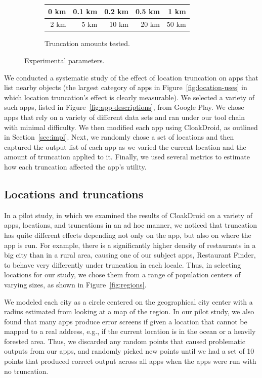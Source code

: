 \documentclass[10pt, conference, compsocconf]{IEEEtran}
\newcommand{\fuzzer}{CloakDroid\xspace}
\begin{document}
{\begin{figure}
    \bigskip{}

    \begin{subfigure}{\columnwidth}
      \centering
      \begin{tabular}{|r|r|r|r|r|} \hline
        0 km & 0.1 km & 0.2 km & 0.5 km & 1 km \\ \hline
         2 km & 5 km & 10 km & 20 km & 50 km \\ \hline
      \end{tabular}
      \caption{Truncation amounts tested.}
      \label{fig:truncations}
    \end{subfigure}

  \caption{Experimental parameters.}
\end{figure}
 
We conducted a systematic study of the effect of location truncation
on apps that list nearby objects (the largest category of apps in
Figure~\ref{fig:location-uses} in which location truncation's effect is clearly
measurable). We selected a variety of such apps, listed in
Figure~\ref{fig:app-descriptions}, from Google Play. We chose apps
that rely on a variety of different data sets and ran under our tool
chain with minimal difficulty.
We then modified each app using \fuzzer, as outlined
in Section~\ref{sec:impl}. Next, we randomly chose a set of locations and
then captured the output list of each app as we varied the current
location and the amount of truncation applied to it. Finally, we used
several metrics to estimate how each truncation affected the app's
utility.

\subsection{Locations and truncations}

In a pilot study, in which we examined the results of \fuzzer{} on a
variety of apps, locations, and truncations in an ad hoc manner,
we noticed that truncation has quite different
effects depending not only on the app, but also on where the app is
run. For example, there is a significantly higher density of restaurants in
a big city than in a rural area, causing one of our subject apps,
Restaurant Finder, to behave very differently under truncation in each locale.
Thus, in selecting locations for
our study, we chose them from a range of population centers of varying
sizes, as shown in Figure~\ref{fig:regions}. 

We modeled each city as a circle centered on the geographical 
city center with a radius estimated
from looking at a map of the region. In
our pilot study, we also found that many apps produce error screens if
given a location that cannot be mapped to a real address, e.g., if the
current location is in the ocean or a heavily forested area.
Thus, we discarded any random points that caused 
problematic outputs from our apps, and randomly picked new
points until we had a set of 10 points that produced correct output
across all apps when the apps were run with no truncation.

}
\end{document}
